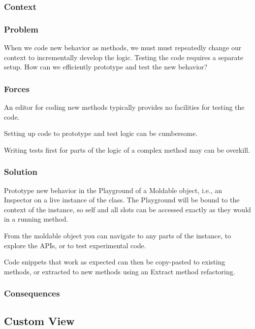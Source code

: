 \documentclass[sigconf]{acmart}
\begin{document}
\subsubsection*{Context}
\subsubsection*{Problem}

When we code new behavior as methods, we must must repeatedly change our context to incrementally develop the logic. Testing the code requires a separate setup. How can we efficiently prototype and test the new behavior?

\subsubsection*{Forces}

An editor for coding new methods typically provides no facilities for testing the code.

Setting up code to prototype and test logic can be cumbersome.

Writing tests first for parts of the logic of a complex method may can be overkill.

\subsubsection*{Solution}

Prototype new behavior in the Playground of a Moldable object, i.e., an Inspector on a live instance of the class. The Playground will be bound to the context of the instance, so self and all slots can be accessed exactly as they would in a running method.

From the moldable object you can navigate to any parts of the instance, to explore the APIs, or to test experimental code.

Code snippets that work as expected can then be copy-pasted to existing methods, or extracted to new methods using an Extract method refactoring.


\subsubsection*{Consequences}

\subsection*{Custom View}\label{pat:customView}
\end{document}

